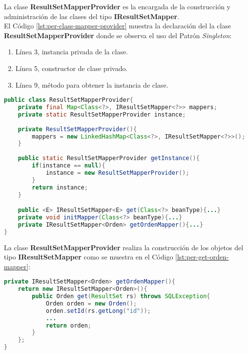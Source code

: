 La clase \textbf{ResultSetMapperProvider} es la encargada de la construcción y administración de las clases del tipo \textbf{IResultSetMapper}.\\
El Código \ref{lst:per-class-mapper-provider} muestra la declaración del la clase \textbf{ResultSetMapperProvider} donde se observa el uso del Patrón \textit{Singleton}:
\begin{enumerate}
	\item Línea 3, instancia privada de la clase.
	\item Línea 5, constructor de clase privado.
	\item Línea 9, método para obtener la instancia de clase.
\end{enumerate}

\begin{lstlisting}[language=Java, caption={Clase ResultSetMapperProvider con Patrón \textit{Singleton}.}, captionpos=b, label={lst:per-class-mapper-provider}]
public class ResultSetMapperProvider{
	private final Map<Class<?>, IResultSetMapper<?>> mappers;
	private static ResultSetMapperProvider instance;
	
	private ResultSetMapperProvider(){
		mappers = new LinkedHashMap<Class<?>, IResultSetMapper<?>>();
	}
	
	public static ResultSetMapperProvider getInstance(){
		if(instance == null){
			instance = new ResultSetMapperProvider();
		}
		return instance;
	}

	public <E> IResultSetMapper<E> get(Class<?> beanType){...}
	private void initMapper(Class<?> beanType){...}
	private IResultSetMapper<Orden> getOrdenMapper(){...}
}
\end{lstlisting}

La clase \textbf{ResultSetMapperProvider} realiza la construcción de los objetos del tipo \textbf{IResultSetMapper} como se muestra en el Código \ref{lst:per-get-orden-mapper}:
\begin{lstlisting}[language=Java, caption={}, captionpos=b, label={lst:per-get-orden-mapper}]
private IResultSetMapper<Orden> getOrdenMapper(){
	return new IResultSetMapper<Orden>(){
		public Orden get(ResultSet rs) throws SQLException{
			Orden orden = new Orden();
			orden.setId(rs.getLong("id"));
			...
			return orden;
		}
	};
}
\end{lstlisting}

